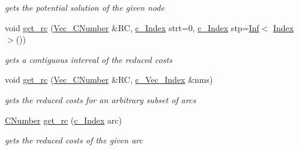 \begin{Indent}
\begin{DoxyCompactItemize}
\begin{DoxyCompactList}\small\item\em gets the potential solution of the given node \end{DoxyCompactList}\item 
void \mbox{\hyperlink{class_s_m_spp__di__unipi__it_1_1_m_c_f_block_a0be3ac1934d307e08d84bcee5d9866d7}{get\+\_\+rc}} (\mbox{\hyperlink{class_s_m_spp__di__unipi__it_1_1_m_c_f_block_a9a7c9495f1f1feab22f3c556b70f60f0}{Vec\+\_\+\+C\+Number}} \&RC, \mbox{\hyperlink{class_s_m_spp__di__unipi__it_1_1_m_c_f_block_aee6156e2ce80720d57a082d80f39d8cc}{c\+\_\+\+Index}} strt=0, \mbox{\hyperlink{class_s_m_spp__di__unipi__it_1_1_m_c_f_block_aee6156e2ce80720d57a082d80f39d8cc}{c\+\_\+\+Index}} stp=\mbox{\hyperlink{class_s_m_spp__di__unipi__it_1_1_inf}{Inf}}$<$ \mbox{\hyperlink{class_s_m_spp__di__unipi__it_1_1_m_c_f_block_ad53d6229d7ec28555a9c9c2fd9abf773}{Index}} $>$())
\begin{DoxyCompactList}\small\item\em gets a contiguous interval of the reduced costs \end{DoxyCompactList}\item 
void \mbox{\hyperlink{class_s_m_spp__di__unipi__it_1_1_m_c_f_block_ad965a7f55852d237761fc948b9e8095b}{get\+\_\+rc}} (\mbox{\hyperlink{class_s_m_spp__di__unipi__it_1_1_m_c_f_block_a9a7c9495f1f1feab22f3c556b70f60f0}{Vec\+\_\+\+C\+Number}} \&RC, \mbox{\hyperlink{class_s_m_spp__di__unipi__it_1_1_m_c_f_block_a03461123d4f6090aefeb97ef653d3f2b}{c\+\_\+\+Vec\+\_\+\+Index}} \&nms)
\begin{DoxyCompactList}\small\item\em gets the reduced costs for an arbitrary subset of arcs \end{DoxyCompactList}\item 
\mbox{\label{class_s_m_spp__di__unipi__it_1_1_m_c_f_block_abe3fd6010ab6c77680ff9711f4010758}} 
\mbox{\hyperlink{class_s_m_spp__di__unipi__it_1_1_m_c_f_block_a24d0627ba8213afe1ec4ebeb4508e8f1}{C\+Number}} \mbox{\hyperlink{class_s_m_spp__di__unipi__it_1_1_m_c_f_block_abe3fd6010ab6c77680ff9711f4010758}{get\+\_\+rc}} (\mbox{\hyperlink{class_s_m_spp__di__unipi__it_1_1_m_c_f_block_aee6156e2ce80720d57a082d80f39d8cc}{c\+\_\+\+Index}} arc)
\begin{DoxyCompactList}\small\item\em gets the reduced costs of the given arc \end{DoxyCompactList}\item 

\end{DoxyCompactItemize}
\end{Indent}

